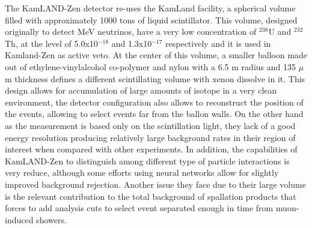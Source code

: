 The KamLAND-Zen detector re-uses the KamLand facility, a spherical volume filled with approximately 1000 tons of liquid scintillator. This volume, designed originally to detect MeV neutrinos, have a very low concentration of $^{238}$U and $^{232}$Th, at the level of 5.0x10$^{-18}$ and 1.3x10$^{-17}$ respectively and it is used in Kamland-Zen as active veto. At the center of this volume, a smaller balloon made out of ethylene-vinylalcohol co-polymer and nylon with a 6.5 m radius and 135 $\mu$m thickness defines a different scintillating volume with xenon dissolve in it. This design allows for accumulation of large amounts of isotope in a very clean environment, the detector configuration also allows to reconstruct the position of the events, allowing to select events far from the ballon walls.
On the other hand as the measurement is based only on the scintillation light, they lack of a good energy resolution producing relatively large background rates in their region of interest when compared with other experiments. In addition, the capabilities of KamLAND-Zen to distinguish among different type of particle interactions is very reduce, although some efforts using neural networks \cite{https://arxiv.org/abs/2203.01870} allow for slightly improved background rejection.
Another issue they face due to their large volume is the relevant contribution to the total background of spallation products that forces to add analysis cuts to select event separated enough in time from muon-induced showers.



